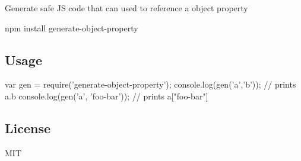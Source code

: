 Generate safe JS code that can used to reference a object property \begin{DoxyVerb}npm install generate-object-property
\end{DoxyVerb}


\href{http://travis-ci.org/mafintosh/generate-object-property}{\tt }

\subsection*{Usage}


\begin{DoxyCode}
var gen = require('generate-object-property');
console.log(gen('a','b')); // prints a.b
console.log(gen('a', 'foo-bar')); // prints a["foo-bar"]
\end{DoxyCode}


\subsection*{License}

M\+IT 